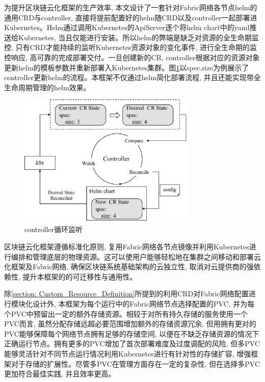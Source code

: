 为提升区块链云化框架的生产效率, 本文设计了一套针对Fabric网络各节点helm的通用CRD与controller, 直接将提前配置好的helm随CRD以及controller一起部署进Kubernetes。Helm通过调用Kubernetes的ApiServer逐个将helm chart中的yaml推送给Kubernetes, 当且仅能进行安装。所以helm的弊端是缺乏对资源的全生命期监控, 只有CRD才能持续的监听Kubernetes资源对象的变化事件, 进行全生命期的监控响应, 高可靠的完成部署交付。一旦创建新的CR, controller根据对应的资源对象更新helm的模板参数并重新部署入Kubernetes集群。图\ref{controller}以spec.size为例展示了controller更新helm的流程。本框架不仅通过helm简化部署流程, 并且还能实现带全生命周期管理的helm效果。

\begin{figure}[h] %
    \centering %
    \includegraphics[width=0.75\textwidth]{FIGs/chapter4/controller.pdf} %
    \caption{controller循环监听} %
    \label{controller} %
\end{figure}%

区块链云化框架遵循标准化原则, 复用Fabric网络各节点镜像并利用Kubernetes进行编排和管理底层的物理资源。这可以使用户能够轻松地在集群之间移动和部署云化框架及Fabric网络, 确保区块链系统基础架构的云独立性, 取消对云提供商的强依赖性, 提升本框架的的可迁移性与通用性。

除\ref{section: Custom_Resource_Definition}所提到的利用CRD对Fabric网络配置进行模块化设计外, 本框架为每个运行中的Fabric网络节点选择配置的PVC, 并为每个PVC中预留出一定的额外存储资源。相较于对所有持久存储的服务使用一个PVC而言, 虽然分配存储远超必要范围增加额外的存储资源冗余, 但用拥有更对的PVC能够保障每个网络节点拥有足够的存储空间, 以便在不缺乏存储资源的情况下正确运行节点。拥有更多的PVC增加了首次部署难度及过度调配的风险, 但多PVC能够灵活针对不同节点运行情况利用Kubernetes进行有针对性的存储扩容, 增强框架对于存储的扩展性。尽管多PVC在管理方面存在一定的复杂性, 但在选择多PVC更加符合最佳实践, 并且效率更高\cite{d2020design}。

